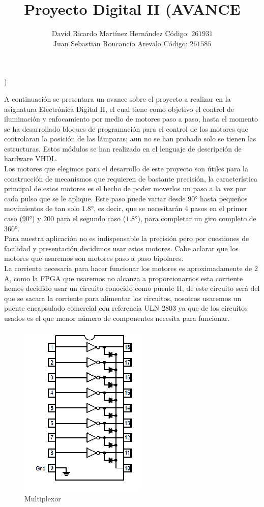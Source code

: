 \documentclass[twocolumn]{IEEEtran}
\begin{document}
\title{Proyecto Digital II (AVANCE})
\author{David Ricardo Martínez Hernández Código: $261931$\\
	Juan Sebastian Roncancio Arevalo Código: $261585$}
\maketitle
{}
\noindent
A continuación se presentara un avance sobre el proyecto a realizar en la asignatura Electrónica Digital II, el cual tiene como objetivo el control de iluminación y enfocamiento por medio de motores paso a paso, hasta el momento se ha desarrollado bloques de programación para el control de los motores que controlaran la posición de las lámparas; aun no se han probado solo se tienen las estructuras. Estos módulos se han realizado en el lenguaje de descripción de hardware VHDL.\\
Los motores que elegimos para el desarrollo de este proyecto son útiles para la construcción de mecanismos que requieren de bastante precisión,  la característica principal de estos motores es el hecho de poder moverlos un paso a la vez por cada pulso que se le aplique. Este paso puede variar desde 90° hasta pequeños movimientos de tan solo $1.8°$, es decir, que se necesitarán 4 pasos en el primer caso ($90°$) y $200$ para el segundo caso ($1.8°$), para completar un giro completo de $360°$.\\
Para nuestra aplicación no es indispensable la precisión pero por cuestiones de facilidad y presentación decidimos usar estos motores. Cabe aclarar que los motores que usaremos son motores paso a paso bipolares.\\
La corriente necesaria para hacer funcionar los motores es aproximadamente de $2$A, como la FPGA que usaremos no alcanza a proporcionarnos esta corriente hemos decidido usar un circuito conocido como puente H, de este circuito será del que se sacara la corriente para alimentar los circuitos, nosotros usaremos un puente encapsulado comercial con referencia ULN 2803 ya que de los circuitos usados es el que menor número de componentes necesita para funcionar.
\begin{figure}[H]
	\centering
		\includegraphics[scale=0.6]{figura1.png}
	\caption{Multiplexor}
	\label{fig1}
\end{figure}
\end{document}
